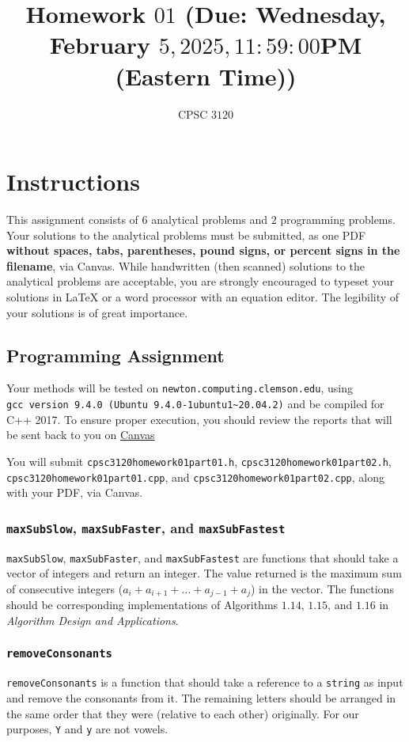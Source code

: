 \documentclass[addpoints,letter,11pt]{exam}
\title{Homework $01$ (Due: Wednesday, February $5, 2025, 11:59:00$PM (Eastern Time))}
\author{CPSC $3120$}
\date{}
\begin{document}
\maketitle

\section*{Instructions}
This assignment consists of $6$ analytical problems and $2$ programming problems. Your solutions to the analytical problems must be submitted, as one PDF \textbf{without spaces, tabs, parentheses, pound signs, or percent signs in the filename}, via Canvas. While handwritten (then scanned) solutions to the analytical problems are acceptable, you are strongly encouraged to typeset your solutions in \LaTeX{} or a word processor with an equation editor. The legibility of your solutions is of great importance.

\subsection*{Programming Assignment}
Your methods will be tested on \verb+newton.computing.clemson.edu+, using\\
\verb!gcc version 9.4.0 (Ubuntu 9.4.0-1ubuntu1~20.04.2)! and be compiled for C++ 2017. To ensure proper execution, you should review the reports that will be sent back to you on \href{https://clemson.instructure.com/courses/201107/grades}{Canvas}

You will submit \verb+cpsc3120homework01part01.h+, \verb+cpsc3120homework01part02.h+, \verb+cpsc3120homework01part01.cpp+,  and \verb+cpsc3120homework01part02.cpp+, along with your PDF, via Canvas.

\subsubsection*{\texttt{maxSubSlow}, \texttt{maxSubFaster}, and \texttt{maxSubFastest}}
\texttt{maxSubSlow}, \texttt{maxSubFaster}, and \texttt{maxSubFastest} are functions that should take a vector of integers and return an integer. The value returned is the maximum sum of consecutive integers ($a_i+a_{i+1}+\dots+a_{j-1}+a_j$) in the vector. The functions should be corresponding implementations of Algorithms $1.14$, $1.15$, and $1.16$ in \emph{Algorithm Design and Applications}.

\subsubsection*{\texttt{removeConsonants}}
\verb+removeConsonants+ is a function that should take a reference to a \texttt{string} as input and remove the consonants from it. The remaining letters should be arranged in the same order that they were (relative to each other) originally. For our purposes, \texttt{Y} and \texttt{y} are not vowels.
\end{document}
